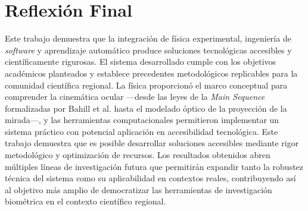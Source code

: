 \section{Reflexión Final}

Este trabajo demuestra que la integración de física experimental, ingeniería de \textit{software} y aprendizaje automático produce soluciones tecnológicas accesibles y científicamente rigurosas.
El sistema desarrollado cumple con los objetivos académicos planteados y establece precedentes metodológicos replicables para la comunidad científica regional.
La física proporcionó el marco conceptual para comprender la cinemática ocular —desde las leyes de la \textit{Main Sequence} formalizadas por Bahill et al.
\cite{bahill1975} hasta el modelado óptico de la proyección de la mirada—, y las herramientas computacionales permitieron implementar un sistema práctico con potencial aplicación en accesibilidad tecnológica.
Este trabajo demuestra que es posible desarrollar soluciones accesibles mediante rigor metodológico y optimización de recursos.
Los resultados obtenidos abren múltiples líneas de investigación futura que permitirán expandir tanto la robustez técnica del sistema como su aplicabilidad en contextos reales, contribuyendo así al objetivo más amplio de democratizar las herramientas de investigación biométrica en el contexto científico regional.